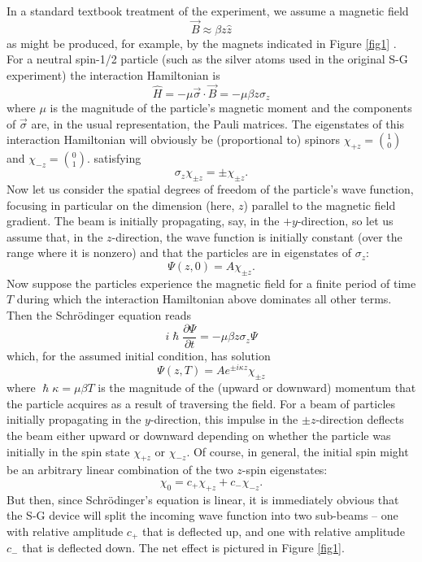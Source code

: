 \documentclass[aps,prc,onecolumn,letterpaper,floatfix,12pt]{revtex4}
\renewcommand{\hbar}{\hslash}
\begin{document}
In a standard textbook treatment of the experiment, we assume a
magnetic field
\begin{equation}
\vec{B} \approx \beta z \hat{z}
\label{b}
\end{equation}
as might be produced, for example, by the magnets indicated in Figure
\ref{fig1} \cite{field}.  
For a neutral spin-1/2 particle (such as the
silver atoms used in the original S-G experiment) the interaction
Hamiltonian is
\begin{equation}
\hat{H} = - \mu \vec{\sigma} \cdot \vec{B} =  - \mu
\beta z \sigma_z
\label{h1}
\end{equation}
where $\mu$ is the magnitude of the particle's magnetic moment and
the components of $\vec{\sigma}$ are, in the usual representation, 
the Pauli matrices.  The eigenstates of this
interaction Hamiltonian will obviously be (proportional to) spinors 
$\chi_{+z} = \binom{1}{0}$ and $\chi_{-z} = \binom{0}{1}$.  
satisfying
\begin{equation}
\sigma_z \chi_{\pm z} = \pm \chi_{\pm z}.
\end{equation}
Now let us consider the spatial degrees of freedom of the particle's
wave function, focusing in particular on the dimension (here, $z$)
parallel to the magnetic field gradient.  The beam is initially
propagating, say, in the $+y$-direction, so let us assume that, in the
$z$-direction, the wave function is initially constant (over the range
where it is nonzero) and that the particles are in eigenstates of $\sigma_z$:
\begin{equation}
\Psi(z,0) = A \chi_{\pm z}.
\end{equation}
Now suppose the particles experience the magnetic field for a
finite period of time $T$ during which the interaction Hamiltonian
above dominates all other terms.  Then the Schr\"odinger equation
reads
\begin{equation}
i \hbar \frac{\partial \Psi}{\partial t} = - \mu \beta z \sigma_z \Psi
\end{equation}
which, for the assumed initial condition, has solution
\begin{equation}
\Psi(z,T)  = A e^{\pm i
  \kappa z} \chi_{\pm z} 
\end{equation}
where $\hbar \kappa = \mu \beta T$ is the magnitude of the (upward or
downward) momentum that the particle acquires as a result of
traversing the field.  For a
beam of particles initially propagating in the $y$-direction, this
impulse in the $\pm z$-direction deflects the beam either upward or
downward depending on whether the particle was initially in the spin
state $\chi_{+z}$ or $\chi_{-z}$.  Of course, in general, the initial spin
might be an arbitrary linear combination of the two $z$-spin
eigenstates:
\begin{equation}
\chi_0 = c_+ \chi_{+z} + c_- \chi_{-z}.
\label{spinor}
\end{equation}
But then, since Schr\"odinger's equation is linear, it is immediately
obvious that the S-G device will split the incoming wave function into
two sub-beams -- one with relative amplitude $c_+$ that is deflected
up, and one with relative amplitude $c_-$ that is deflected down.
The net effect is pictured in Figure \ref{fig1}.
\end{document}
